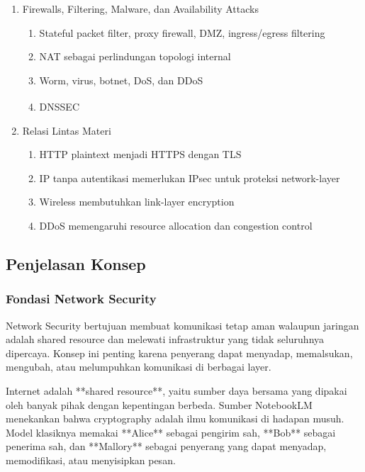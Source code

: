 \begin{enumerate}
\begin{enumerate}
        \item \ppaham TLS 1.3\textsuperscript{\dag}
        \item \pwajib CCMP pada WPA2/802.11i\textsuperscript{\ddag}
    \end{enumerate}
    \item \pwajib Firewalls, Filtering, Malware, dan Availability Attacks
    \begin{enumerate}
        \item \pwajib Stateful packet filter, proxy firewall, DMZ, ingress/egress filtering
        \item \ppaham NAT sebagai perlindungan topologi internal
        \item \pwajib Worm, virus, botnet, DoS, dan DDoS
        \item \ppaham DNSSEC\textsuperscript{\dag}
    \end{enumerate}
    \item \pwajib Relasi Lintas Materi
    \begin{enumerate}
        \item \pwajib HTTP plaintext menjadi HTTPS dengan TLS
        \item \pwajib IP tanpa autentikasi memerlukan IPsec untuk proteksi network-layer
        \item \pwajib Wireless membutuhkan link-layer encryption
        \item \pwajib DDoS memengaruhi resource allocation dan congestion control
    \end{enumerate}
\end{enumerate}

\subsection{Penjelasan Konsep}

\subsubsection{Fondasi Network Security}
\begin{jawab}
Network Security bertujuan membuat komunikasi tetap aman walaupun jaringan adalah shared resource dan melewati infrastruktur yang tidak seluruhnya dipercaya. Konsep ini penting karena penyerang dapat menyadap, memalsukan, mengubah, atau melumpuhkan komunikasi di berbagai layer.
\end{jawab}

Internet adalah **shared resource**, yaitu sumber daya bersama yang dipakai oleh banyak pihak dengan kepentingan berbeda. Sumber NotebookLM menekankan bahwa cryptography adalah ilmu komunikasi di hadapan musuh. Model klasiknya memakai **Alice** sebagai pengirim sah, **Bob** sebagai penerima sah, dan **Mallory** sebagai penyerang yang dapat menyadap, memodifikasi, atau menyisipkan pesan.


